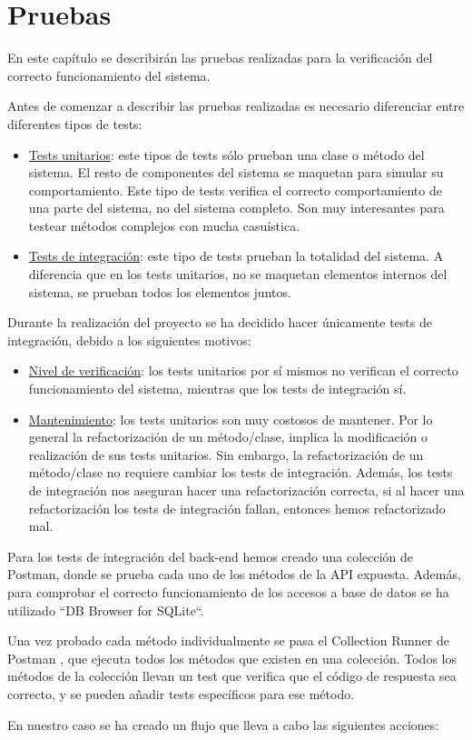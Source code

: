 \chapter{Pruebas}
\label{chap:pruebas}

\label{sect:intropruebas}
En este capítulo se describirán las pruebas realizadas para la verificación del correcto funcionamiento del sistema.

Antes de comenzar a describir las pruebas realizadas es necesario diferenciar entre diferentes tipos de tests:
\begin{itemize}
\item\underline{Tests unitarios}: este tipos de tests sólo prueban una clase o método del sistema. El resto de componentes del sistema se
maquetan para simular su comportamiento. Este tipo de tests verifica el correcto comportamiento de una parte del sistema, no del sistema
completo. Son muy interesantes para testear métodos complejos con mucha casuística.
\item\underline{Tests de integración}: este tipo de tests prueban la totalidad del sistema. A diferencia que en los tests unitarios, no se
maquetan elementos internos del sistema, se prueban todos los elementos juntos.
\end{itemize}

Durante la realización del proyecto se ha decidido hacer únicamente tests de integración, debido a los siguientes motivos:
\begin{itemize}
\item\underline{Nivel de verificación}: los tests unitarios por sí mismos no verifican el correcto funcionamiento del sistema, mientras que los tests de integración sí.
\item\underline{Mantenimiento}: los tests unitarios son muy costosos de mantener. Por lo general la refactorización de un método/clase, implica la 
modificación o realización de sus tests unitarios. Sin embargo, la refactorización de un método/clase no requiere cambiar los tests de integración. Además,
los tests de integración nos aseguran hacer una refactorización correcta, si al hacer una refactorización los tests de integración fallan, entonces hemos 
refactorizado mal. 

\end{itemize}

\label{sect:pruebasback}

Para los tests de integración del back-end hemos creado una colección de Postman, donde se prueba cada uno de los métodos de la API expuesta. Además, para 
comprobar el correcto funcionamiento de los accesos a base de datos se ha utilizado ``DB Browser for SQLite``.
\par
Una vez probado cada método individualmente se pasa el Collection Runner de Postman \cite{Postman:CollectionRunner}, que ejecuta todos los métodos que existen en una colección. Todos los métodos
de la colección llevan un test que verifica que el código de respuesta sea correcto, y se pueden añadir tests específicos para ese método.
\par
En nuestro caso se ha creado un flujo que lleva a cabo las siguientes acciones:

